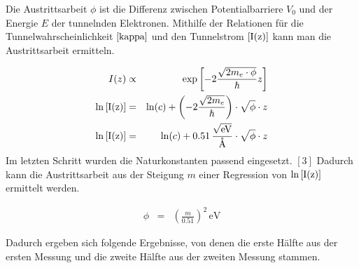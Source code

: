 \documentclass[12pt,a4paper]{scrartcl}
\numberwithin{equation}{section} %
\renewcommand{\[}{} %
\renewcommand{\]}{\noindent} %
\begin{document}
Die Austrittsarbeit \(\phi\) ist die Differenz zwischen
Potentialbarriere \(V_0\) und der Energie \(E\) der tunnelnden
Elektronen. Mithilfe der Relationen für die Tunnelwahrscheinlichkeit
\(\eqref{kappa}\) und den Tunnelstrom \(\eqref{I(z)}\) kann man die
Austrittsarbeit ermitteln.

\[
\begin{eqnarray}
    I(z) &\propto& \exp\left[-2\frac{\sqrt{2m_e\cdot \phi}}{\hbar} z\right] \\
    \ln\eqref{I(z)}
        &=& \ln(c)
            + \left(-2\frac{\sqrt{2m_e}}{\hbar}\right)
            \cdot \sqrt{\phi} \cdot z \\
    \ln\eqref{I(z)} &=& \ln(c) + 0.51 \mathrm{\,\frac{\sqrt{eV}}{\mathrm{\mathring{A}}}}\cdot \sqrt{\phi} \cdot z
\end{eqnarray}
\] Im letzten Schritt wurden die Naturkonstanten passend eingesetzt.
\([3]\) Dadurch kann die Austrittsarbeit aus der Steigung \(m\) einer
Regression von \(\ln\eqref{I(z)}\) ermittelt werden.

\[
\begin{eqnarray}
    \phi &=& \left(\frac{m}{0.51}\right)^2 \mathrm{\,eV}
\end{eqnarray}
\]

Dadurch ergeben sich folgende Ergebnisse, von denen die erste Hälfte aus
der ersten Messung und die zweite Hälfte aus der zweiten Messung
stammen.
\end{document}
